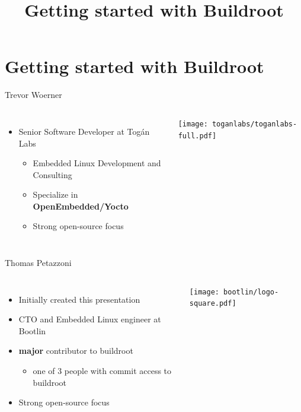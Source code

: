 \documentclass[aspectratio=169,obeyspaces,spaces,hyphens,dvipsnames]{beamer}
\title{Getting started with Buildroot}
\institute{Togán Labs}
\begin{document}
\section{Getting started with Buildroot}

\begin{frame}{Trevor Woerner}
  \begin{columns}
      \begin{itemize}
      \item Senior Software Developer at Togán Labs
        \begin{itemize}
        \item Embedded Linux Development and Consulting
        \item Specialize in {\bf OpenEmbedded/Yocto}
        \item Strong open-source focus
        \end{itemize}
      \end{itemize}
      \texttt{[image: toganlabs/toganlabs-full.pdf]}
    \end{columns}
\end{frame}

\begin{frame}{Thomas Petazzoni}
  \begin{columns}
      \begin{itemize}
      \item Initially created this presentation
      \item CTO and Embedded Linux engineer at Bootlin
      \item {\bf major} contributor to buildroot
      \begin{itemize}
        \item one of 3 people with commit access to buildroot
      \end{itemize}
      \item Strong open-source focus
      \end{itemize}
      \texttt{[image: bootlin/logo-square.pdf]}
    \end{columns}
\end{frame}
\end{document}

